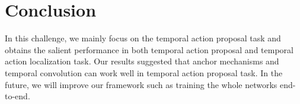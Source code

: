 \documentclass[10pt,twocolumn,letterpaper]{article}
\begin{document}
\section{Conclusion}

In this challenge, we mainly focus on the temporal action proposal task and obtains the salient performance in both temporal action proposal and temporal action localization task. Our results suggested that anchor mechanisms and temporal convolution can work well in temporal action proposal task. In the future, we will improve our framework such as training the whole networks end-to-end.

{\small


}
\end{document}
